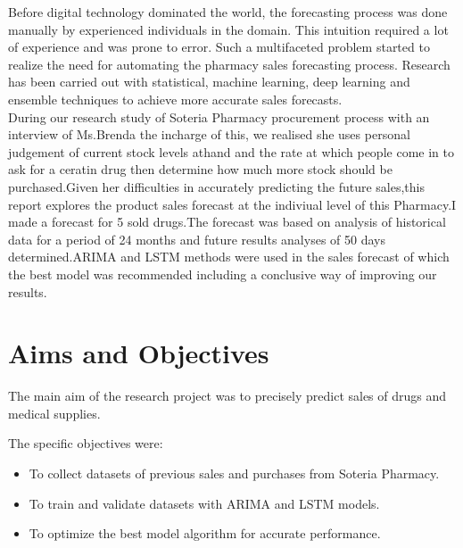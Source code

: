 \documentclass[12pt]{report}
\begin{document}
Before digital technology dominated the world, the forecasting process was done manually by experienced individuals in the domain. This intuition required a lot of experience and was prone to error. Such a multifaceted problem started to realize the need for automating the pharmacy sales forecasting process. Research has been carried out with statistical, machine learning, deep learning and ensemble techniques to achieve more accurate sales forecasts. \cite{Perera2019}\\

During our research study of Soteria Pharmacy procurement process with an interview of Ms.Brenda the incharge of this, we realised she uses personal judgement of current stock levels athand and the rate at which people come in to ask for a ceratin drug then determine how much more stock should be purchased.Given her difficulties in accurately predicting the future sales,this report explores the product sales forecast at the indiviual level of this Pharmacy.I made a forecast for 5 sold drugs.The forecast was based on analysis of  historical data for a period of 24 months and future results analyses of 50 days determined.ARIMA and LSTM methods were used in the sales forecast of which the best model was recommended including a conclusive way of improving our results.
\section{Aims and Objectives}

The main aim of the research project was to precisely predict sales of drugs and medical supplies.

The specific objectives  were:

\begin{itemize}[topsep=0pt]

\item To collect datasets of previous sales and purchases from Soteria Pharmacy.

\item To train and validate datasets with ARIMA and LSTM models.

\item To optimize the best model algorithm for accurate performance.

\end{itemize}
\end{document}
